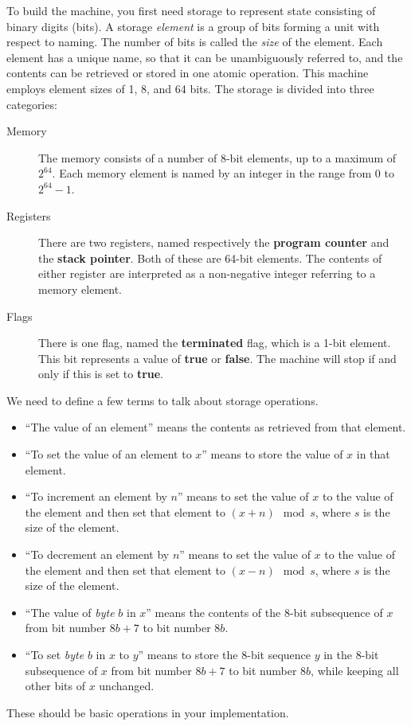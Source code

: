 \documentclass[a4paper,11pt]{article}
\newcommand{\PC}{\textbf{program counter}\xspace}
\newcommand{\SP}{\textbf{stack pointer}\xspace}
\newcommand{\TERM}{\textbf{terminated}\xspace}
\newcommand{\F}{\textbf{false}\xspace}
\newcommand{\T}{\textbf{true}\xspace}
\begin{document}
To build the machine, you first need storage to represent state consisting of binary digits (bits).
A storage \emph{element} is a group of bits forming a unit with respect to naming.
The number of bits is called the \emph{size} of the element.
Each element has a unique name, so that it can be unambiguously referred to, and the contents can be retrieved or stored in one atomic operation.
This machine employs element sizes of 1, 8, and 64 bits.
The storage is divided into three categories:
\begin{description}
\item[Memory] 
The memory consists of a number of 8-bit elements, up to a maximum of $2^{64}$.
Each memory element is named by an integer in the range from $0$ to $2^{64} - 1$.
\item[Registers] 
There are two registers, named respectively the \PC and the \SP.
Both of these are 64-bit elements.
The contents of either register are interpreted as a non-negative integer referring to a memory element.
\item[Flags] 
There is one flag, named the \TERM flag, which is a 1-bit element.
This bit represents a value of \T or \F.
The machine will stop if and only if this is set to \T.
\end{description}
We need to define a few terms to talk about storage operations.
\begin{itemize}
\item ``The value of an element'' means the contents as retrieved from that element.
\item ``To set the value of an element to $x$'' means to store the value of $x$ in that element.
\item ``To increment an element by $n$'' means to set the value of $x$ to the value of the element and then set that element to $(x + n) \mod s$, where $s$ is the size of the element.
\item ``To decrement an element by $n$'' means to set the value of $x$ to the value of the element and then set that element to $(x - n) \mod s$, where $s$ is the size of the element.
\item ``The value of \emph{byte} $b$ in $x$'' means the contents of the 8-bit subsequence of $x$ from bit number $8b+7$ to bit number $8b$.
\item ``To set \emph{byte} $b$ in $x$ to $y$'' means to store the 8-bit sequence $y$ in the 8-bit subsequence of $x$ from bit number $8b+7$ to bit number $8b$, while keeping all other bits of $x$ unchanged.
\end{itemize}
These should be basic operations in your implementation.
\end{document}
